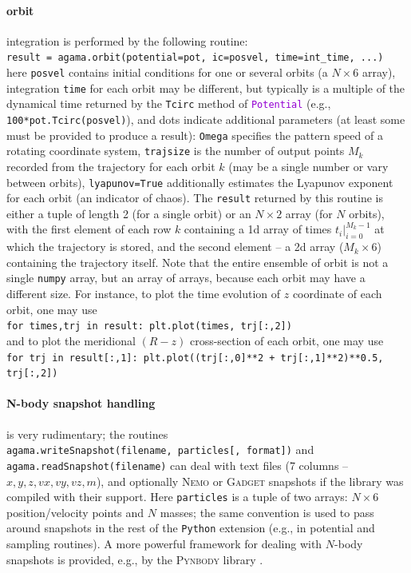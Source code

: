 \documentclass[12pt]{article}
\newcommand{\Nemo} {\textsc{Nemo}\xspace}
\newcommand{\Python}{\texttt{Python}\xspace}
\newcommand{\ttt}[1]{\textcolor{darkviolet}{\texttt{#1}}}
\begin{document}
\paragraph{orbit} integration is performed by the following routine:\\
\texttt{result = agama.orbit(potential=pot, ic=posvel, time=int_time, ...)}\\
here \texttt{posvel} contains initial conditions for one or several orbits (a $N\times6$ array), integration \texttt{time} for each orbit may be different, but typically is a multiple of the dynamical time returned by the \texttt{Tcirc} method of \ttt{Potential} (e.g., \texttt{100*pot.Tcirc(posvel)}), and dots indicate additional parameters (at least some must be provided to produce a result): \texttt{Omega} specifies the pattern speed of a rotating coordinate system, \texttt{trajsize} is the number of output points $M_k$ recorded from the trajectory for each orbit $k$ (may be a single number or vary between orbits), \texttt{lyapunov=True} additionally estimates the Lyapunov exponent for each orbit (an indicator of chaos).
The \texttt{result} returned by this routine is either a tuple of length 2 (for a single orbit) or an $N\times2$ array (for $N$ orbits), with the first element of each row $k$ containing a 1d array of times $t_i |_{i=0}^{M_k-1}$ at which the trajectory is stored, and the second element -- a 2d array ($M_k\times6$) containing the trajectory itself. Note that the entire ensemble of orbit is not a single \texttt{numpy} array, but an array of arrays, because each orbit may have a different size.
For instance, to plot the time evolution of $z$ coordinate of each orbit, one may use\\
\texttt{for times,trj in result: plt.plot(times, trj[:,2])}\\
and to plot the meridional $(R-z)$ cross-section of each orbit, one may use\\
\texttt{for trj in result[:,1]: plt.plot((trj[:,0]**2 + trj[:,1]**2)**0.5, trj[:,2])}

\paragraph{N-body snapshot handling} \label{sec:PythonSnapshot} is very rudimentary; the routines\\
\texttt{agama.writeSnapshot(filename, particles[, format])} and\\ \texttt{agama.readSnapshot(filename)} can deal with text files (7 columns -- $x,y,z,vx,vy,vz,m$), and optionally \Nemo or \textsc{Gadget} snapshots if the library was compiled with their support. Here \texttt{particles} is a tuple of two arrays: $N\times6$ position/velocity points and $N$ masses; the same convention is used to pass around snapshots in the rest of the \Python extension (e.g., in potential and sampling routines). A more powerful framework for dealing with $N$-body snapshots is provided, e.g., by the \textsc{Pynbody} library \cite{Pynbody}.
\end{document}
